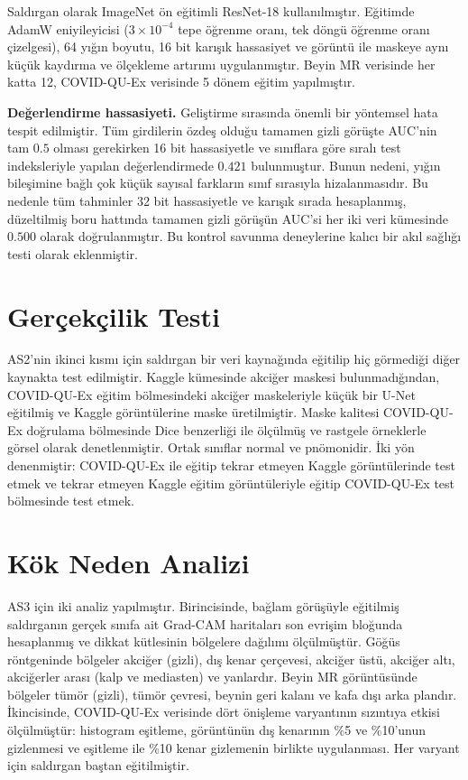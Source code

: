 Saldırgan olarak ImageNet ön eğitimli ResNet-18 \cite{he2016resnet} kullanılmıştır. Eğitimde AdamW eniyileyicisi ($3 \times 10^{-4}$ tepe öğrenme oranı, tek döngü öğrenme oranı çizelgesi), 64 yığın boyutu, 16 bit karışık hassasiyet ve görüntü ile maskeye aynı küçük kaydırma ve ölçekleme artırımı uygulanmıştır. Beyin MR verisinde her katta 12, COVID-QU-Ex verisinde 5 dönem eğitim yapılmıştır.

\textbf{Değerlendirme hassasiyeti.} Geliştirme sırasında önemli bir yöntemsel hata tespit edilmiştir. Tüm girdilerin özdeş olduğu tamamen gizli görüşte AUC'nin tam $0.5$ olması gerekirken 16 bit hassasiyetle ve sınıflara göre sıralı test indeksleriyle yapılan değerlendirmede $0.421$ bulunmuştur. Bunun nedeni, yığın bileşimine bağlı çok küçük sayısal farkların sınıf sırasıyla hizalanmasıdır. Bu nedenle tüm tahminler 32 bit hassasiyetle ve karışık sırada hesaplanmış, düzeltilmiş boru hattında tamamen gizli görüşün AUC'si her iki veri kümesinde $0.500$ olarak doğrulanmıştır. Bu kontrol savunma deneylerine kalıcı bir akıl sağlığı testi olarak eklenmiştir.

\section{Gerçekçilik Testi}\label{sec:transfer}

AS2'nin ikinci kısmı için saldırgan bir veri kaynağında eğitilip hiç görmediği diğer kaynakta test edilmiştir. Kaggle kümesinde akciğer maskesi bulunmadığından, COVID-QU-Ex eğitim bölmesindeki akciğer maskeleriyle küçük bir U-Net \cite{ronneberger2015unet} eğitilmiş ve Kaggle görüntülerine maske üretilmiştir. Maske kalitesi COVID-QU-Ex doğrulama bölmesinde Dice benzerliği ile ölçülmüş ve rastgele örneklerle görsel olarak denetlenmiştir. Ortak sınıflar normal ve pnömonidir. İki yön denenmiştir: COVID-QU-Ex ile eğitip tekrar etmeyen Kaggle görüntülerinde test etmek ve tekrar etmeyen Kaggle eğitim görüntüleriyle eğitip COVID-QU-Ex test bölmesinde test etmek.

\section{Kök Neden Analizi}\label{sec:rootcause}

AS3 için iki analiz yapılmıştır. Birincisinde, bağlam görüşüyle eğitilmiş saldırganın gerçek sınıfa ait Grad-CAM \cite{selvaraju2017gradcam} haritaları son evrişim bloğunda hesaplanmış ve dikkat kütlesinin bölgelere dağılımı ölçülmüştür. Göğüs röntgeninde bölgeler akciğer (gizli), dış kenar çerçevesi, akciğer üstü, akciğer altı, akciğerler arası (kalp ve mediasten) ve yanlardır. Beyin MR görüntüsünde bölgeler tümör (gizli), tümör çevresi, beynin geri kalanı ve kafa dışı arka plandır. İkincisinde, COVID-QU-Ex verisinde dört önişleme varyantının sızıntıya etkisi ölçülmüştür: histogram eşitleme, görüntünün dış kenarının \%5 ve \%10'unun gizlenmesi ve eşitleme ile \%10 kenar gizlemenin birlikte uygulanması. Her varyant için saldırgan baştan eğitilmiştir.


